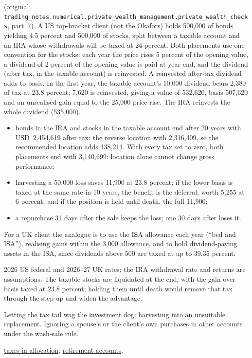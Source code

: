\begin{qfmethod}
 (original; \nolinkurl{trading_notes.numerical.private_wealth_management.private_wealth_checks}, part~7). A US top-bracket client (not the Okafors) holds 500,000 of bonds yielding 4.5 percent and 500,000 of stocks, split between a taxable account and an IRA whose withdrawals will be taxed at 24 percent. Both placements use one convention for the stocks: each year the price rises 5 percent of the opening value, a dividend of 2 percent of the opening value is paid at year-end, and the dividend (after tax, in the taxable account) is reinvested. A reinvested after-tax dividend adds to basis. In the first year, the taxable account's 10,000 dividend bears 2,380 of tax at 23.8 percent; 7,620 is reinvested, giving a value of 532,620, basis 507,620 and an unrealised gain equal to the 25,000 price rise. The IRA reinvests the whole dividend (535,000).
\begin{itemize}
\item bonds in the IRA and stocks in the taxable account end after 20 years with USD~2,454,619 after tax; the reverse location with 2,316,409, so the recommended location adds 138,211. With every tax set to zero, both placements end with 3,140,699: location alone cannot change gross performance;
\item harvesting a 50,000 loss saves 11,900 at 23.8 percent; if the lower basis is taxed at the same rate in 10 years, the benefit is the deferral, worth 5,255 at 6 percent, and if the position is held until death, the full 11,900;
\item a repurchase 31 days after the sale keeps the loss; one 30 days after loses it.
\end{itemize}
For a UK client the analogue is to use the ISA allowance each year (``bed and ISA''), realising gains within the 3,000 allowance, and to hold dividend-paying assets in the ISA, since dividends above 500 are taxed at up to 39.35 percent.

 2026 US federal and 2026--27 UK rates; the IRA withdrawal rate and returns are assumptions. The taxable stocks are liquidated at the end, with the gain over basis taxed at 23.8 percent; holding them until death would remove that tax through the step-up and widen the advantage.

 Letting the tax tail wag the investment dog: harvesting into an unsuitable replacement. Ignoring a spouse's or the client's own purchases in other accounts under the wash-sale rule.

 \hyperref[meth:allocation-constraints-taxes-revision]{taxes in allocation}; \hyperref[meth:retirement-across-jurisdictions]{retirement accounts}.

\end{qfmethod}

